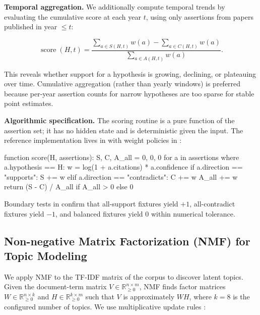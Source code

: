 \documentclass[
  english,
]{article}
\newenvironment{Shaded}{}{}
\newcommand{\NormalTok}[1]{#1}
\newcommand{\score}{\operatorname{score}}
\begin{document}
\textbf{Temporal aggregation.} We additionally compute temporal trends
by evaluating the cumulative score at each year \(t\), using only
assertions from papers published in year \(\leq t\):

\begin{equation}
\score(H, t) = \frac{\sum_{a \in S(H,t)} w(a) - \sum_{a \in C(H,t)} w(a)}{\sum_{a \in A(H,t)} w(a)}. \label{eq:app_score_t}
\end{equation}

This reveals whether support for a hypothesis is growing, declining, or
plateauing over time. Cumulative aggregation (rather than yearly
windows) is preferred because per-year assertion counts for narrow
hypotheses are too sparse for stable point estimates.

\textbf{Algorithmic specification.} The scoring routine is a pure
function of the assertion set; it has no hidden state and is
deterministic given the input. The reference implementation lives in
 with weight policies in
:

\begin{Shaded}
\begin{Highlighting}[]
\NormalTok{function score(H, assertions):}
\NormalTok{    S, C, A\_all = 0, 0, 0}
\NormalTok{    for a in assertions where a.hypothesis == H:}
\NormalTok{        w = log(1 + a.citations) * a.confidence}
\NormalTok{        if a.direction == "supports":     S     += w}
\NormalTok{        elif a.direction == "contradicts": C     += w}
\NormalTok{        A\_all += w}
\NormalTok{    return (S {-} C) / A\_all  if A\_all \textgreater{} 0  else 0}
\end{Highlighting}
\end{Shaded}

Boundary tests in  confirm that
all-support fixtures yield \(+1\), all-contradict fixtures yield \(-1\),
and balanced fixtures yield \(0\) within numerical tolerance.

\FloatBarrier

\subsection{Non-negative Matrix Factorization (NMF) for Topic
Modeling}\label{sec:appendix_nmf}

We apply NMF to the TF-IDF matrix of the corpus to discover latent
topics. Given the document-term matrix
\(V \in \mathbb{R}^{n \times m}_{\geq 0}\), NMF finds factor matrices
\(W \in \mathbb{R}^{n \times k}_{\geq 0}\) and
\(H \in \mathbb{R}^{k \times m}_{\geq 0}\) such that \(V\) is
approximately \(W H\), where \(k = 8\) is the configured number of
topics. We use multiplicative update rules \citep{lee1999nmf}:
\end{document}
